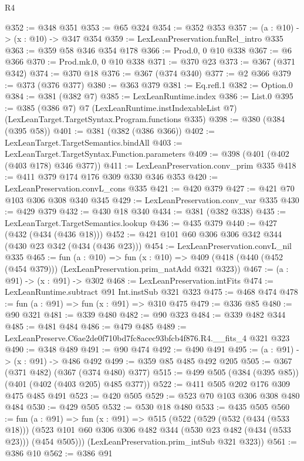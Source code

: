 \begin{lexlean}{R4}
\begin{coremodule}
@352 := @348 @351
@353 := @65 @324
@354 := @352 @353
@357 := (a : @10) -> (x : @10) -> @347 @354
@359 := LexLeanPreservation.funRel_intro @335
@363 := @359 @58 @346 @354 @178
@366 := Prod.{0, 0} @10 @338
@367 := @6 @366
@370 := Prod.mk.{0, 0} @10 @338
@371 := @370 @23
@373 := @367 (@371 @342)
@374 := @370 @18
@376 := @367 (@374 @340)
@377 := @2 @366
@379 := @373 (@376 @377)
@380 := @363 @379
@381 := Eq.refl.{1}
@382 := Option.{0}
@384 := @381 (@382 @7)
@385 := LexLeanRuntime.index
@386 := List.{0}
@395 := @385
    (@386 @7)
    @7
    (LexLeanRuntime.instIndexableList @7)
    (LexLeanTarget.TargetSyntax.Program.functions @335)
@398 := @380 (@384 (@395 @58))
@401 := @381 (@382 (@386 @366))
@402 := LexLeanTarget.TargetSemantics.bindAll
@403 := LexLeanTarget.TargetSyntax.Function.parameters
@409 := @398 (@401 (@402 (@403 @178) @346 @377))
@411 := LexLeanPreservation.conv_prim @335
@418 := @411 @379 @174 @176 @309 @330 @346 @353
@420 := LexLeanPreservation.convL_cons @335
@421 := @420 @379
@427 := @421 @70 @103 @306 @308 @340 @345
@429 := LexLeanPreservation.conv_var @335
@430 := @429 @379
@432 := @430 @18 @340
@434 := @381 (@382 @338)
@435 := LexLeanTarget.TargetSemantics.lookup
@436 := @435 @379
@440 := @427 (@432 (@434 (@436 @18)))
@452 := @421 @101 @60 @306 @306 @342 @344 (@430 @23 @342 (@434 (@436 @23)))
@454 := LexLeanPreservation.convL_nil @335
@465 := fun (a : @10) =>
  fun (x : @10) => @409 (@418 (@440 (@452 (@454 @379))) (LexLeanPreservation.prim_natAdd @321 @323))
@467 := (a : @91) -> (x : @91) -> @302
@468 := LexLeanPreservation.intFits
@474 := LexLeanRuntime.subtract @91 Int.instSub @321 @323
@475 := @468 @474
@478 := fun (a : @91) => fun (x : @91) => @310 @475
@479 := @336 @85
@480 := @90 @321
@481 := @339 @480
@482 := @90 @323
@484 := @339 @482 @344
@485 := @481 @484
@486 := @479 @485
@489 := LexLeanPreserve.C6ae2de0f710bd7fc8acec93bfcb4f876.R4.__fits_4 @321 @323
@490 := @348 @489
@491 := @90 @474
@492 := @490 @491
@495 := (a : @91) -> (x : @91) -> @486 @492
@499 := @359 @85 @485 @492 @205
@505 := @367 (@371 @482) (@367 (@374 @480) @377)
@515 := @499 @505 (@384 (@395 @85)) (@401 (@402 (@403 @205) @485 @377))
@522 := @411 @505 @202 @176 @309 @475 @485 @491
@523 := @420 @505
@529 := @523 @70 @103 @306 @308 @480 @484
@530 := @429 @505
@532 := @530 @18 @480
@533 := @435 @505
@560 := fun (a : @91) =>
  fun (x : @91) =>
  @515
    (@522
      (@529
        (@532 (@434 (@533 @18)))
        (@523 @101 @60 @306 @306 @482 @344 (@530 @23 @482 (@434 (@533 @23))) (@454 @505)))
      (LexLeanPreservation.prim_intSub @321 @323))
@561 := @386 @10
@562 := @386 @91

\end{coremodule}
\end{lexlean}
